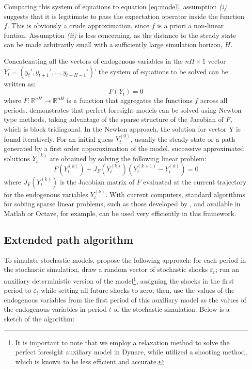 \documentclass[a4paper,11pt]{amsart}
\begin{document}
\smallskip\smallskip

Comparing this system of equations to equation \eqref{eq:model},
assumption \emph{(i)} suggests that it is legitimate to pass the
expectation operator inside the function \(f\). This is obviously a
crude approximation, since \(f\) is a priori a non-linear
funtion. Assumption \emph{(ii)} is less concerning, as the distance to
the steady state can be made arbitrarily small with a sufficiently
large simulation horizon, $H$.\newline

Concatenating all the vectors of endogenous variables in
the \(nH\times 1\)
vector \(Y_t = \left(y_t',y_{t+1}', \ldots, y_{t+H-1}' \right)\)' the
system of equations to be solved can be written as:
\[
   F(Y_t) = 0
\]
where $F: \mathbb{R}^{nH} \rightarrow \mathbb{R}^{nH}$ is a function
that aggregates the functions $f$ across all
periods. \textcite{Laffargue1990} demonstrates that perfect foresight
models can be solved using Newton-type methods, taking advantage of
the sparse structure of the Jacobian of $F$, which is block
tridiagonal. In the Newton approach, the solution for vector Y is
found iteratively. For an initial guess $Y_t^{(0)}$, usually the
steady state or a path generated by a first order apporoximation of
the model, successive approximated solutions $Y_t^{(k)}$ are obtained
by solving the following linear problem:
\[
   F\left( Y_t^{(k)} \right) + J_F\left(Y_t^{(k)}\right) \left( Y_t^{(k+1)} - Y_t^{(k)} \right)  = 0
\]
where $J_F\left(Y_t^{(k)}\right)$ is the Jacobian matrix of $F$
evaluated at the current trajectory for the endogenous
variables $Y_t^{(k)}$. With current computers, standard algorithms for
solving sparse linear problems, such as those developed by
\textcite{Davis2006}, and available in Matlab or Octave, for example,
can be used very efficiently in this framework.\newline

\subsection{Extended path algorithm}

To simulate stochastic models, \textcite{FairTaylor1983} propose the
following approach: for each period in the stochastic simulation, draw
a random vector of stochastic shocks \(\varepsilon_t\); run an
auxiliary deterministic version of the model\footnote{It is important
   to note that we employ a relaxation method to solve the perfect
   foresight auxiliary model in Dynare, while \textcite{FairTaylor1983}
   utilized a shooting method, which is known to be less efficient and
   accurate.}, assigning the shocks in the first period
to \(\varepsilon_t\) while setting all future shocks to zero; then,
use the values of the endogenous variables from the first period of
this auxiliary model as the values of the endogenous variables in
period \(t\) of the stochastic simulation. Below is a sketch of the algorithm:\newline
\end{document}
